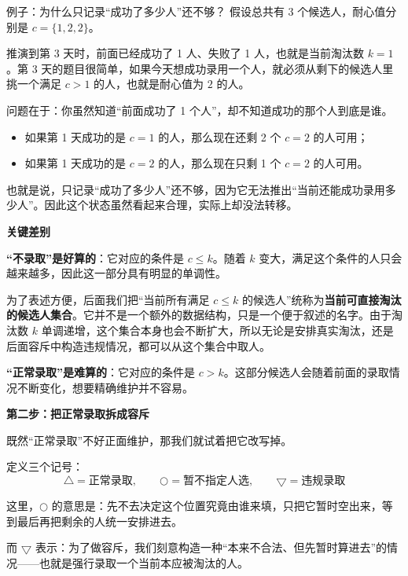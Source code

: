\documentclass{book}
\newcommand{\NormalTake}{\ensuremath{\bigtriangleup}}
\newcommand{\FreeTake}{\ensuremath{\bigcirc}}
\newcommand{\BadTake}{\ensuremath{\bigtriangledown}}
\begin{document}
\begin{examplebox}{例子：为什么只记录“成功了多少人”还不够？}
假设总共有 3 个候选人，耐心值分别是 $c=\{1,2,2\}$。

推演到第 3 天时，前面已经成功了 1 人、失败了 1 人，也就是当前淘汰数 $k=1$。第 3 天的题目很简单，如果今天想成功录用一个人，就必须从剩下的候选人里挑一个满足 $c>1$ 的人，也就是耐心值为 $2$ 的人。

问题在于：你虽然知道“前面成功了 1 个人”，却不知道成功的那个人到底是谁。

\begin{itemize}[leftmargin=2.2em,itemsep=2pt,topsep=2pt]
    \item 如果第 1 天成功的是 $c=1$ 的人，那么现在还剩 2 个 $c=2$ 的人可用；
    \item 如果第 1 天成功的是 $c=2$ 的人，那么现在只剩 1 个 $c=2$ 的人可用。
\end{itemize}

也就是说，只记录“成功了多少人”还不够，因为它无法推出“当前还能成功录用多少人”。因此这个状态虽然看起来合理，实际上却没法转移。
\end{examplebox}

\par\medskip
\noindent\textbf{关键差别}
\par\medskip
\textbf{“不录取”是好算的}：它对应的条件是 $c \le k$。随着 $k$ 变大，满足这个条件的人只会越来越多，因此这一部分具有明显的单调性。

为了表述方便，后面我们把“当前所有满足 $c \le k$ 的候选人”统称为\textbf{当前可直接淘汰的候选人集合}。它并不是一个额外的数据结构，只是一个便于叙述的名字。由于淘汰数 $k$ 单调递增，这个集合本身也会不断扩大，所以无论是安排真实淘汰，还是后面容斥中构造违规情况，都可以从这个集合中取人。

\textbf{“正常录取”是难算的}：它对应的条件是 $c > k$。这部分候选人会随着前面的录取情况不断变化，想要精确维护并不容易。

\par\medskip
\noindent\textbf{第二步：把正常录取拆成容斥}
\par\medskip

既然“正常录取”不好正面维护，那我们就试着把它改写掉。

定义三个记号：
\[
\NormalTake = \text{正常录取}, \qquad
\FreeTake = \text{暂不指定人选}, \qquad
\BadTake = \text{违规录取}
\]

这里，$\FreeTake$ 的意思是：先不去决定这个位置究竟由谁来填，只把它暂时空出来，等到最后再把剩余的人统一安排进去。

而 $\BadTake$ 表示：为了做容斥，我们刻意构造一种“本来不合法、但先暂时算进去”的情况——也就是强行录取一个当前本应被淘汰的人。
\end{document}
